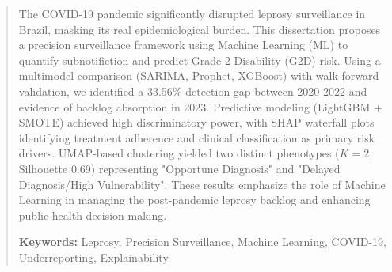 \documentclass[
12pt, %
oneside, %
english, %
onehalfspacing,%
liststotoc, %
parskip, %
headsepline, %
]{MastersDoctoralThesis} %
\begin{document}
\begin{titlepage}
\begin{center}
\begin{minipage}[t]{\textwidth}
\begin{center}





\end{center}
\end{minipage}
 

\end{center}
\end{titlepage}


\frontmatter

\begin{abstract}
The COVID-19 pandemic significantly disrupted leprosy surveillance in Brazil, masking its real epidemiological burden. This dissertation proposes a precision surveillance framework using Machine Learning (ML) to quantify subnotifiction and predict Grade 2 Disability (G2D) risk. Using a multimodel comparison (SARIMA, Prophet, XGBoost) with walk-forward validation, we identified a 33.56\% detection gap between 2020-2022 and evidence of backlog absorption in 2023. Predictive modeling (LightGBM + SMOTE) achieved high discriminatory power, with SHAP waterfall plots identifying treatment adherence and clinical classification as primary risk drivers. UMAP-based clustering yielded two distinct phenotypes ($K=2$, Silhouette 0.69) representing "Opportune Diagnosis" and "Delayed Diagnosis/High Vulnerability". These results emphasize the role of Machine Learning in managing the post-pandemic leprosy backlog and enhancing public health decision-making.

\textbf{Keywords:} Leprosy, Precision Surveillance, Machine Learning, COVID-19, Underreporting, Explainability.
\end{abstract}
\end{document}
